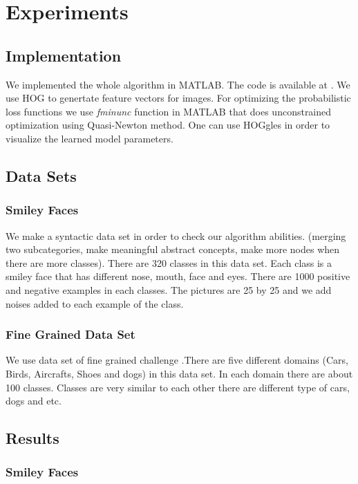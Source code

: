\documentclass[10pt,twocolumn,letterpaper]{article}
\begin{document}
\section {Experiments}
 
 \subsection {Implementation}
 We implemented the whole algorithm in MATLAB.  The code is available at \cite{website:sourceCode}. We use HOG \cite{hog} to genertate feature vectors for images. 
 For optimizing the probabilistic loss functions we use \textit{fminunc} function in MATLAB that does unconstrained optimization using Quasi-Newton method. 
 One can use HOGgles \cite{hoggles} in order to visualize the learned model parameters.
 
 \subsection{Data Sets}
 \subsubsection{Smiley Faces}
 We make a syntactic data set in order to check our algorithm abilities. (merging two subcategories, make meaningful abstract concepts, make more nodes when there are more classes). There are 320 classes in this data set. Each class is a smiley face that has different nose, mouth, face and eyes. There are 1000 positive and negative examples in each classes. The pictures are 25 by 25 and we add noises added to each example of the class.
  
 \subsubsection{Fine Grained Data Set}
 We use data set of fine grained challenge \cite{dataSet}.There are five different domains (Cars, Birds, Aircrafts, Shoes and dogs) in this data set. In each domain there are about 100 classes. Classes are very similar to each other there are different type of cars, dogs and etc.
 \subsection{Results}
 \subsubsection{Smiley Faces}
 
\end{document}
